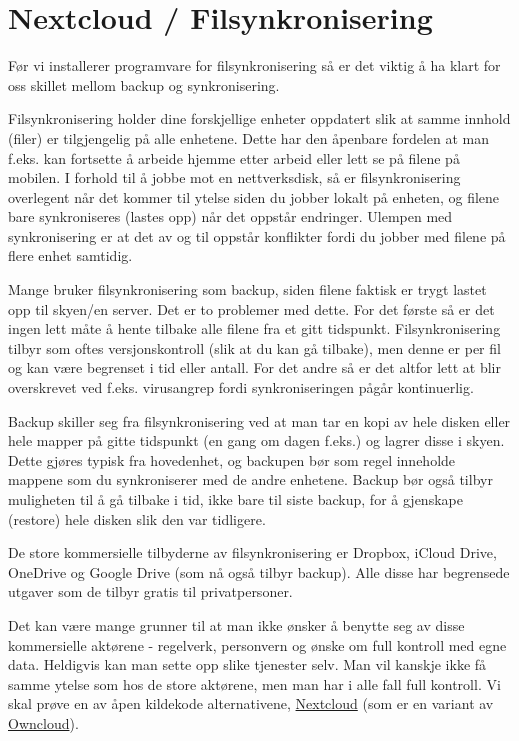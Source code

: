 \chapter{Nextcloud / Filsynkronisering}

Før vi installerer programvare for filsynkronisering så er det viktig
å ha klart for oss skillet mellom backup og synkronisering.

Filsynkronisering holder dine forskjellige enheter oppdatert slik at
samme innhold (filer) er tilgjengelig på alle enhetene. Dette har den
åpenbare fordelen at man f.eks. kan fortsette å arbeide hjemme etter 
arbeid eller lett se på filene på mobilen. I forhold til å jobbe mot
en nettverksdisk, så er filsynkronisering overlegent når det kommer
til ytelse siden du jobber lokalt på enheten, og filene bare 
synkroniseres (lastes opp) når det oppstår endringer. Ulempen med 
synkronisering er at det av og til oppstår konflikter fordi du 
jobber med filene på flere enhet samtidig. 

Mange bruker filsynkronisering som backup, siden filene faktisk er 
trygt lastet opp til skyen/en server. Det er to problemer med dette.
For det første så er det ingen lett måte å hente tilbake alle filene
fra et gitt tidspunkt. Filsynkronisering tilbyr som oftes 
versjonskontroll (slik at du kan gå tilbake), men denne er per fil og
kan være begrenset i tid eller antall. For det andre så er det altfor
lett at  blir overskrevet ved f.eks. virusangrep
fordi synkroniseringen pågår kontinuerlig.

Backup skiller seg fra filsynkronisering ved at man tar en kopi av hele
disken eller hele mapper på gitte tidspunkt (en gang om dagen f.eks.) 
og lagrer disse i skyen. Dette gjøres typisk fra hovedenhet, og 
backupen bør som regel inneholde mappene som du synkroniserer 
med de andre enhetene. Backup bør også tilbyr muligheten til å gå 
tilbake i tid, ikke bare til siste backup, for å gjenskape (restore) 
hele disken slik den var tidligere.

De store kommersielle tilbyderne av filsynkronisering er Dropbox,
iCloud Drive, OneDrive og Google Drive (som nå også tilbyr backup). 
Alle disse har begrensede utgaver som de tilbyr gratis til privatpersoner.

Det kan være mange grunner til at man ikke ønsker å benytte seg av 
disse kommersielle aktørene - regelverk, personvern og ønske om full
kontroll med egne data. Heldigvis kan man sette opp slike tjenester
selv. Man vil kanskje ikke få samme ytelse som hos de store aktørene,
men man har i alle fall full kontroll. Vi skal prøve en av åpen 
kildekode alternativene, \href{https://nextcloud.com/}{Nextcloud} 
(som er en variant av \href{https://owncloud.org/}{Owncloud}).   

